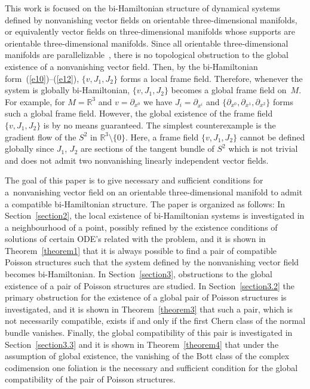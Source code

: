 \documentclass[10pt,a4paper]{amsart}
\numberwithin{equation}{section}
\begin{document}
This work is focused on the bi-Hamiltonian structure of dynamical systems def\/ined by non\-va\-nishing vector f\/ields on orientable three-dimensional manifolds, or equivalently vector f\/ields on three-dimensional manifolds whose supports are orientable three-dimensional manifolds. Since all orientable three-dimensional manifolds are parallelizable~\cite{Steifel}, there is no topological obstruction to the global existence of a nonvanishing vector f\/ield. Then, by the bi-Hamiltonian form~(\ref{e10})--(\ref{e12}), $\{ v,J_{1},J_{2}\} $ forms a local frame f\/ield. Therefore, whenever the system is globally bi-Hamiltonian, $\{v,J_{1},J_{2}\} $ becomes a global frame f\/ield on~$M$. For example, for $M=\mathbb{R}^{3}$ and $v=\partial _{x^{0}}$ we have $J_{i}=\partial _{x^{i}}$ and $\{ \partial _{x^{0}},\partial _{x^{1}},\partial _{x^{2}}\} $ forms such a global frame f\/ield. However, the global existence of the frame f\/ield $\{ v,J_{1},J_{2}\} $ is by no means guaranteed. The simplest counterexample is the gradient f\/low of the $S^{2}$ in $\mathbb{R}^{3}\setminus \{0\} $. Here, a frame f\/ield $\{ v,J_{1},J_{2}\}$ cannot be def\/ined globally since $J_{1}$, $J_{2}$ are sections of the tangent bundle of $S^{2}$ which is not trivial and does not admit two nonvanishing linearly independent vector f\/ields.

The goal of this paper is to give necessary and suf\/f\/icient conditions for a~nonvanishing vector f\/ield on an orientable three-dimensional manifold to admit a compatible bi-Hamiltonian structure. The paper is organized as follows: In Section~\ref{section2}, the local existence of bi-Hamiltonian systems is investigated in a neighbourhood of a point, possibly ref\/ined by the existence conditions of solutions of certain ODE's related with the problem, and it is shown in Theorem~\ref{theorem1} that it is always possible to f\/ind a pair of compatible Poisson structures such that the system def\/ined by the nonvanishing vector f\/ield becomes bi-Hamiltonian. In Section~\ref{section3}, obstructions to the global existence of a pair of Poisson structures are studied. In Section~\ref{section3.2} the primary obstruction for the existence of a global pair of Poisson structures is investigated, and it is shown in Theorem~\ref{theorem3} that such a pair, which is not necessarily compatible, exists if and only if the f\/irst Chern class of the normal bundle vanishes. Finally, the global compatibility of this pair is investigated in Section~\ref{section3.3} and it is shown in Theorem~\ref{theorem4} that under the assumption of global existence, the vanishing of the Bott class of the complex codimension one foliation is the necessary and suf\/f\/icient condition for the global compatibility of the pair of Poisson structures.
\end{document}
